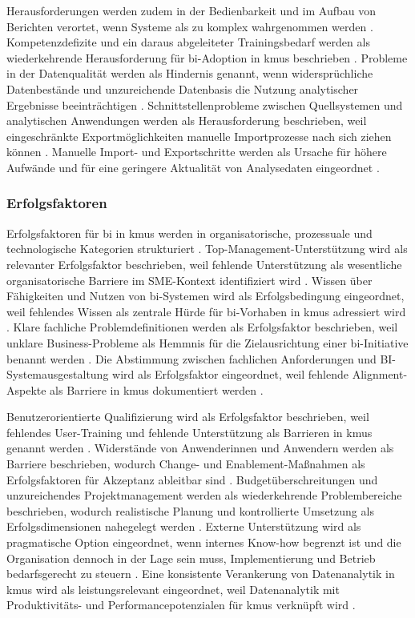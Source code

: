 Herausforderungen werden zudem in der Bedienbarkeit und im Aufbau von Berichten verortet, wenn Systeme als zu komplex wahrgenommen werden \cite{GudfinnssonStrand2017}. 
Kompetenzdefizite und ein daraus abgeleiteter Trainingsbedarf werden als wiederkehrende Herausforderung für \gls{bi}-Adoption in \glspl{kmu} beschrieben \cite{GudfinnssonStrand2017}. Probleme in der Datenqualität werden als Hindernis genannt, wenn widersprüchliche Datenbestände und unzureichende Datenbasis die Nutzung analytischer Ergebnisse beeinträchtigen \cite{GudfinnssonStrand2017}. Schnittstellenprobleme zwischen Quellsystemen und analytischen Anwendungen werden als Herausforderung beschrieben, weil eingeschränkte Exportmöglichkeiten manuelle Importprozesse nach sich ziehen können \cite{GudfinnssonStrand2017}. Manuelle Import- und Exportschritte werden als Ursache für höhere Aufwände und für eine geringere Aktualität von Analysedaten eingeordnet \cite{GudfinnssonStrand2017}. 

\subsubsection{Erfolgsfaktoren}
Erfolgsfaktoren für \gls{bi} in \glspl{kmu} werden in organisatorische, prozessuale und technologische Kategorien strukturiert \cite{OlszakZiemba2012}. 
Top-Management-Unterstützung wird als relevanter Erfolgsfaktor beschrieben, weil fehlende Unterstützung als wesentliche organisatorische Barriere im SME-Kontext identifiziert wird \cite{OlszakZiemba2012}. Wissen über Fähigkeiten und Nutzen von \gls{bi}-Systemen wird als Erfolgsbedingung eingeordnet, weil fehlendes Wissen als zentrale Hürde für \gls{bi}-Vorhaben in \glspl{kmu} adressiert wird \cite{OlszakZiemba2012}. Klare fachliche Problemdefinitionen werden als Erfolgsfaktor beschrieben, weil unklare Business-Probleme als Hemmnis für die Zielausrichtung einer \gls{bi}-Initiative benannt werden \cite{OlszakZiemba2012}. Die Abstimmung zwischen fachlichen Anforderungen und BI-Systemausgestaltung wird als Erfolgsfaktor eingeordnet, weil fehlende Alignment-Aspekte als Barriere in \glspl{kmu} dokumentiert werden \cite{OlszakZiemba2012}. 

Benutzerorientierte Qualifizierung wird als Erfolgsfaktor beschrieben, weil fehlendes User-Training und fehlende Unterstützung als Barrieren in \glspl{kmu} genannt werden \cite{OlszakZiemba2012}. Widerstände von Anwenderinnen und Anwendern werden als Barriere beschrieben, wodurch Change- und Enablement-Maßnahmen als Erfolgsfaktoren für Akzeptanz ableitbar sind \cite{OlszakZiemba2012}. Budgetüberschreitungen und unzureichendes Projektmanagement werden als wiederkehrende Problembereiche beschrieben, wodurch realistische Planung und kontrollierte Umsetzung als Erfolgsdimensionen nahegelegt werden \cite{OlszakZiemba2012}. Externe Unterstützung wird als pragmatische Option eingeordnet, wenn internes Know-how begrenzt ist und die Organisation dennoch in der Lage sein muss, Implementierung und Betrieb bedarfsgerecht zu steuern \cite{TaticDzaficHaracic2018}. Eine konsistente Verankerung von Datenanalytik in \glspl{kmu} wird als leistungsrelevant eingeordnet, weil Datenanalytik mit Produktivitäts- und Performancepotenzialen für \glspl{kmu} verknüpft wird \cite{BianchiniMichalkova2019}. 

